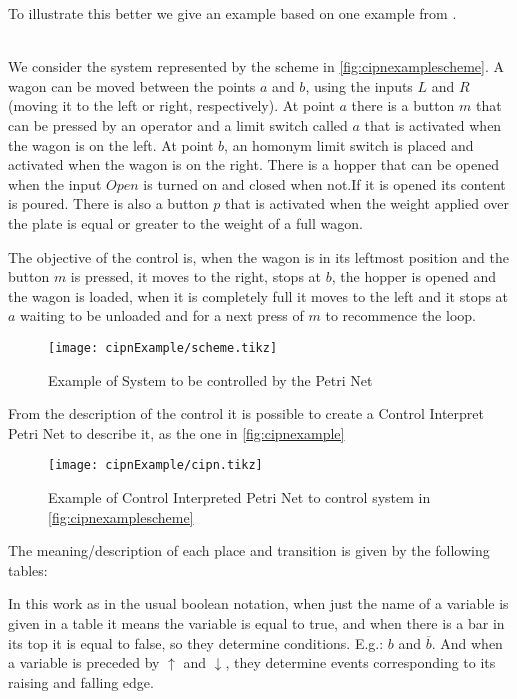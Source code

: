 To illustrate this better we give an example based on one example from \cite{david1989grafcet}.
\begin{example} ~\\
  \label{ex:loadingOfAWagon}
We consider the system represented by the scheme in
\autoref{fig:cipnexamplescheme}. A wagon can be moved between the points $a$ and
$b$, using the inputs $L$ and $R$ (moving it to the left or right,
respectively). At point $a$ there is a button $m$ that can be pressed by an
operator and a limit switch called $a$ that is activated when the wagon is on
the left. At point $b$, an homonym limit switch is placed and activated when the
wagon is on the right. There is a hopper that can
be opened when the input $Open$ is turned on and closed when not.If it is opened
its content is poured. There is also a
button $p$ that is activated when the weight applied over the plate is equal or
greater to the weight of a full wagon. 

The objective of the control is, when the wagon is in its leftmost position and
the button $m$ is pressed, it moves to the right, stops at $b$, the hopper is
opened and the wagon is loaded, when it is completely full it moves to the left
and it stops at $a$ waiting to be unloaded and for a next press of $m$ to recommence
the loop. 
\end{example}


\begin{figure}[H]
  \centering \texttt{[image: cipnExample/scheme.tikz]}
  \caption[cipnexample]{Example of System to be controlled by the Petri Net}
  \label{fig:cipnexamplescheme}
\end{figure}
From the description of the control it is possible to create a Control Interpret
Petri Net to describe it, as the one in \autoref{fig:cipnexample}


\begin{figure}[H]
  \centering \texttt{[image: cipnExample/cipn.tikz]}
  \caption[cipnexample]{Example of Control Interpreted Petri Net to control
    system in \autoref{fig:cipnexamplescheme}}
  \label{fig:cipnexample}
\end{figure}

The meaning\slash description of each place and transition is given by the
following tables:




In this work as in the usual boolean notation, when just the name of a variable is given in a table it means the
variable is equal to true, and when there is a bar in its top it is equal to
false, so they determine conditions. E.g.: $b$ and $\overline{b}$.
And when a variable is preceded by $\uparrow$ and $\downarrow$, they  determine
events corresponding to its raising and falling edge.

